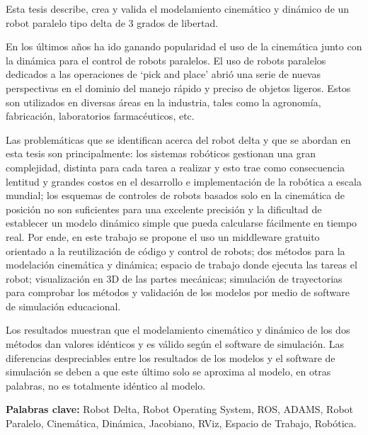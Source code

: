 \thispagestyle{fancy}
\vspace{5mm}

Esta tesis describe, crea y valida el modelamiento cinemático y dinámico de un robot paralelo tipo delta de 3 grados de libertad. 

En los últimos años ha ido ganando popularidad el uso de la cinemática junto con la dinámica para el control de robots paralelos. El uso de robots paralelos dedicados a las operaciones de ‘pick and place’ abrió una serie de nuevas perspectivas en el dominio del manejo rápido y preciso de objetos ligeros. Estos son utilizados en diversas áreas en la industria, tales como la agronomía, fabricación, laboratorios farmacéuticos, etc.

Las problemáticas que se identifican acerca del robot delta y que se abordan en esta tesis son principalmente: los sistemas robóticos gestionan una gran complejidad, distinta para cada tarea a realizar y esto trae como consecuencia lentitud y grandes costos en el desarrollo  e implementación de la robótica a escala mundial; los esquemas de controles de robots basados solo en la cinemática de posición no son suficientes para una excelente precisión y  la dificultad de establecer un modelo dinámico simple que pueda calcularse fácilmente en tiempo real. Por ende, en este trabajo se propone el uso un middleware gratuito orientado a la reutilización de código y control de robots; dos métodos para la modelación cinemática y dinámica; espacio de trabajo donde ejecuta las tareas el robot; visualización en 3D de las partes mecánicas; simulación de trayectorias para comprobar los métodos y validación de los modelos por medio de software de simulación educacional.  

Los resultados muestran que el modelamiento cinemático y dinámico de los dos métodos dan valores idénticos y es válido según el software de simulación. Las diferencias despreciables entre los resultados de los modelos y el software de simulación se deben a que este último solo se aproxima al modelo, en otras palabras, no es totalmente idéntico al modelo.

\vfill
\noindent\textbf{Palabras clave:} Robot Delta, Robot Operating System, ROS, ADAMS, Robot Paralelo, Cinemática, Dinámica, Jacobiano, RViz, Espacio de Trabajo, Robótica.
